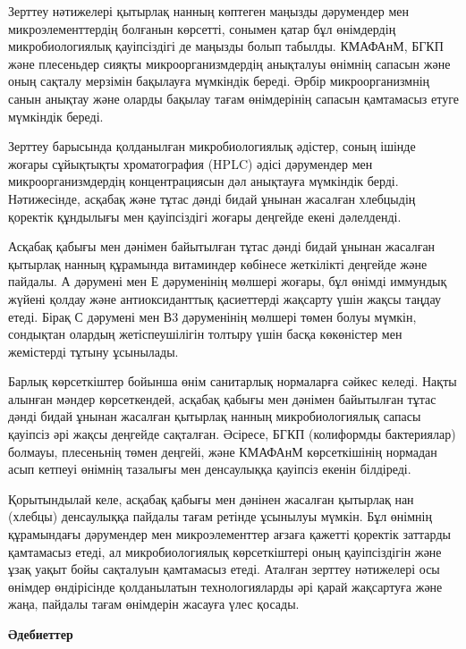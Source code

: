 \begin{multicols}{2}
Зерттеу нәтижелері қытырлақ нанның көптеген маңызды дәрумендер мен
микроэлементтердің болғанын көрсетті, сонымен қатар бұл өнімдердің
микробиологиялық қауіпсіздігі де маңызды болып табылды. КМАФАнМ, БГКП
және плесеньдер сияқты микроорганизмдердің анықталуы өнімнің сапасын
және оның сақталу мерзімін бақылауға мүмкіндік береді. Әрбір
микроорганизмнің санын анықтау және оларды бақылау тағам өнімдерінің
сапасын қамтамасыз етуге мүмкіндік береді.

Зерттеу барысында қолданылған микробиологиялық әдістер, соның ішінде
жоғары сұйықтықты хроматография (HPLC) әдісі дәрумендер мен
микроорганизмдердің концентрациясын дәл анықтауға мүмкіндік берді.
Нәтижесінде, асқабақ және тұтас дәнді бидай ұнынан жасалған хлебцыдің
қоректік құндылығы мен қауіпсіздігі жоғары деңгейде екені дәлелденді.

Асқабақ қабығы мен дәнімен байытылған тұтас дәнді бидай ұнынан жасалған
қытырлақ нанның құрамында витаминдер көбінесе жеткілікті деңгейде және
пайдалы. А дәрумені мен Е дәруменінің мөлшері жоғары, бұл өнімді
иммундық жүйені қолдау және антиоксиданттық қасиеттерді жақсарту үшін
жақсы таңдау етеді. Бірақ С дәрумені мен В3 дәруменінің мөлшері төмен
болуы мүмкін, сондықтан олардың жетіспеушілігін толтыру үшін басқа
көкөністер мен жемістерді тұтыну ұсынылады.

Барлық көрсеткіштер бойынша өнім санитарлық нормаларға сәйкес келеді.
Нақты алынған мәндер көрсеткендей, асқабақ қабығы мен дәнімен байытылған
тұтас дәнді бидай ұнынан жасалған қытырлақ нанның микробиологиялық
сапасы қауіпсіз әрі жақсы деңгейде сақталған. Әсіресе, БГКП (колиформды
бактериялар) болмауы, плесеньнің төмен деңгейі, және КМАФАнМ
көрсеткішінің нормадан асып кетпеуі өнімнің тазалығы мен денсаулыққа
қауіпсіз екенін білдіреді.

Қорытындылай келе, асқабақ қабығы мен дәнінен жасалған қытырлақ нан
(хлебцы) денсаулыққа пайдалы тағам ретінде ұсынылуы мүмкін. Бұл өнімнің
құрамындағы дәрумендер мен микроэлементтер ағзаға қажетті қоректік
заттарды қамтамасыз етеді, ал микробиологиялық көрсеткіштері оның
қауіпсіздігін және ұзақ уақыт бойы сақталуын қамтамасыз етеді. Аталған
зерттеу нәтижелері осы өнімдер өндірісінде қолданылатын технологияларды
әрі қарай жақсартуға және жаңа, пайдалы тағам өнімдерін жасауға үлес
қосады.
\end{multicols}

\begin{center}
{\bfseries Әдебиеттер}
\end{center}

